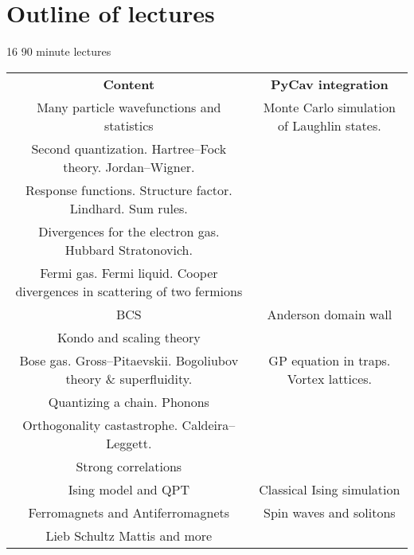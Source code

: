 \section{Outline of lectures}

16 90 minute lectures

\begin{table} 
    \begin{tabular}{ c | c }
     \textbf{Content}   & \textbf{PyCav integration}  \\ 
       Many particle wavefunctions and statistics 
   & Monte Carlo simulation of Laughlin states. \\ 
      Second quantization. Hartree--Fock theory. Jordan--Wigner.  &  \\ 
      Response functions. Structure factor. Lindhard. Sum rules.     &  \\ 
        Divergences for the electron gas. Hubbard Stratonovich. & \\
      Fermi gas. Fermi liquid. Cooper divergences in scattering of two fermions  &  \\ 
      BCS   & Anderson domain wall  \\ 
      Kondo and scaling theory   &  \\ 
      Bose gas. Gross--Pitaevskii. Bogoliubov theory \& superfluidity.   & GP equation in traps. Vortex lattices. \\ 
      Quantizing a chain. Phonons   &  \\ 
      Orthogonality castastrophe. Caldeira--Leggett.   &  \\ 
      Strong correlations   &  \\ 
      Ising model and QPT   &  Classical Ising simulation \\ 
      Ferromagnets and Antiferromagnets   & Spin waves and solitons \\ 
      Lieb Schultz Mattis and more
    \end{tabular} 
\end{table}

